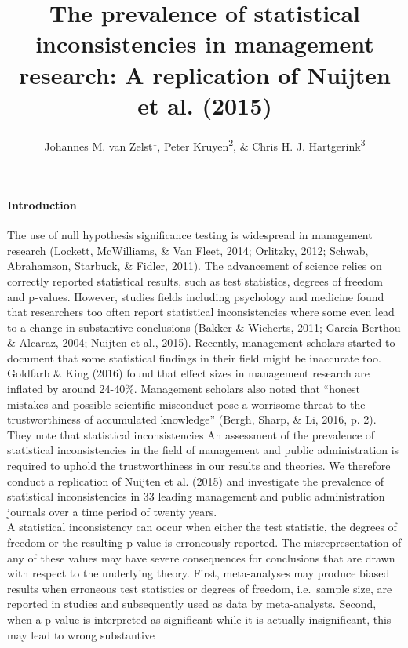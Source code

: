\documentclass[english,man]{apa6}
\title{The prevalence of statistical inconsistencies in management research: A
replication of Nuijten et al. (2015)}
\author{Johannes M. van Zelst\textsuperscript{1}, Peter Kruyen\textsuperscript{2}, \& Chris H. J. Hartgerink\textsuperscript{3}}
\affiliation{
    \vspace{0.5cm}
          \textsuperscript{1} Department of Organization Studies, Tilburg University\\
          \textsuperscript{2} Department of Public Administration, Radboud University Nijmegen\\
          \textsuperscript{3} Department of Methodology and Statistics, Tilburg University  }
\begin{document}
\maketitle



\paragraph{Introduction}\label{introduction}

The use of null hypothesis significance testing is widespread in
management research (Lockett, McWilliams, \& {Van Fleet}, 2014;
Orlitzky, 2012; Schwab, Abrahamson, Starbuck, \& Fidler, 2011). The
advancement of science relies on correctly reported statistical results,
such as test statistics, degrees of freedom and p-values. However,
studies fields including psychology and medicine found that researchers
too often report statistical inconsistencies where some even lead to a
change in substantive conclusions (Bakker \& Wicherts, 2011;
Garc{í}a-Berthou \& Alcaraz, 2004; Nuijten et al., 2015). Recently,
management scholars started to document that some statistical findings
in their field might be inaccurate too. Goldfarb \& King (2016) found
that effect sizes in management research are inflated by around 24-40\%.
Management scholars also noted that \enquote{honest mistakes and
possible scientific misconduct pose a worrisome threat to the
trustworthiness of accumulated knowledge} (Bergh, Sharp, \& Li, 2016, p.
2). They note that statistical inconsistencies An assessment of the
prevalence of statistical inconsistencies in the field of management and
public administration is required to uphold the trustworthiness in our
results and theories. We therefore conduct a replication of Nuijten et
al. (2015) and investigate the prevalence of statistical inconsistencies
in 33 leading management and public administration journals over a time
period of twenty years.\\A statistical inconsistency can occur when
either the test statistic, the degrees of freedom or the resulting
p-value is erroneously reported. The misrepresentation of any of these
values may have severe consequences for conclusions that are drawn with
respect to the underlying theory. First, meta-analyses may produce
biased results when erroneous test statistics or degrees of freedom,
i.e.~sample size, are reported in studies and subsequently used as data
by meta-analysts. Second, when a p-value is interpreted as significant
while it is actually insignificant, this may lead to wrong substantive
\end{document}
